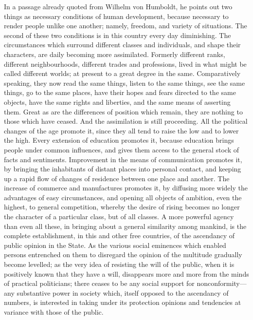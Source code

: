 \documentclass[11pt,openany]{book}
\begin{document}
In a passage already quoted from Wilhelm von Humboldt, he points out two things as necessary conditions of human development, because necessary to render people unlike one another; namely, freedom, and variety of situations. The second of these two conditions is in this country every day diminishing. The circumstances which surround different classes and individuals, and shape their characters, are daily becoming more assimilated. Formerly different ranks, different neighbourhoods, different trades and professions, lived in what might be called different worlds; at present to a great degree in the same. Comparatively speaking, they now read the same things, listen to the same things, see the same things, go to the same places, have their hopes and fears directed to the same objects, have the same rights and liberties, and the same means of asserting them. Great as are the differences of position which remain, they are nothing to those which have ceased. And the assimilation is still proceeding. All the political changes of the age promote it, since they all tend to raise the low and to lower the high. Every extension of education promotes it, because education brings people under common influences, and gives them access to the general stock of facts and sentiments. Improvement in the means of communication promotes it, by bringing the inhabitants of distant places into personal contact, and keeping up a rapid flow of changes of residence between one place and another. The increase of commerce and manufactures promotes it, by diffusing more widely the advantages of easy circumstances, and opening all objects of ambition, even the highest, to general competition, whereby the desire of rising becomes no longer the character of a particular class, but of all classes. A more powerful agency than even all these, in bringing about a general similarity among mankind, is the complete establishment, in this and other free countries, of the ascendancy of public opinion in the State. As the various social eminences which enabled persons entrenched on them to disregard the opinion of the multitude gradually become levelled; as the very idea of resisting the will of the public, when it is positively known that they have a will, disappears more and more from the minds of practical politicians; there ceases to be any social support for nonconformity---any substantive power in society which, itself opposed to the ascendancy of numbers, is interested in taking under its protection opinions and tendencies at variance with those of the public.
\end{document}
